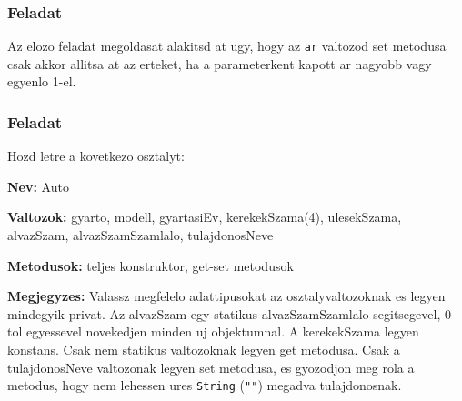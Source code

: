 \documentclass{article}
\let\l\lstinline
\begin{document}
\subsubsection{Feladat}

Az elozo feladat megoldasat alakitsd at ugy, hogy az \l{ar} valtozod set metodusa csak akkor allitsa at az erteket, ha a parameterkent kapott ar nagyobb vagy egyenlo 1-el.

\subsubsection{Feladat}

Hozd letre a kovetkezo osztalyt:

\textbf{Nev:} Auto

\textbf{Valtozok:} gyarto, modell, gyartasiEv, kerekekSzama(4), ulesekSzama, alvazSzam, alvazSzamSzamlalo, tulajdonosNeve

\textbf{Metodusok:} teljes konstruktor, get-set metodusok

\textbf{Megjegyzes:} Valassz megfelelo adattipusokat az osztalyvaltozoknak es legyen mindegyik privat. Az alvazSzam egy statikus alvazSzamSzamlalo segitsegevel, 0-tol egyessevel novekedjen minden uj objektumnal. A kerekekSzama legyen konstans. Csak nem statikus valtozoknak legyen get metodusa. Csak a tulajdonosNeve valtozonak legyen set metodusa, es gyozodjon meg rola a metodus, hogy nem lehessen ures \l{String} (\l{""}) megadva tulajdonosnak.
\end{document}
